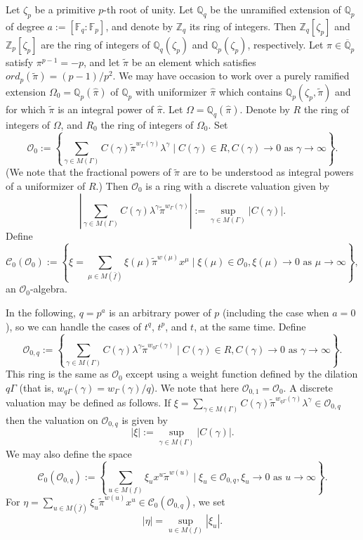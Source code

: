 \documentclass{article}
\theoremstyle{remark}
\def\bb #1{ {\mathbb #1} }
\def\c #1{ {\mathcal #1} }
\begin{document}
\bigskip{}  Let $\zeta_p$ be a primitive $p$-th root of unity. Let $\bb Q_q$ be the unramified extension of $\bb Q_p$ of degree $a := [\bb F_q : \bb F_p]$, and denote by $\bb Z_q$ its ring of integers. Then $\bb Z_q[\zeta_p]$ and $\bb Z_p[\zeta_p]$ are the ring of integers of $\bb Q_q(\zeta_p)$ and $\bb Q_p(\zeta_p)$, respectively. Let $\pi \in \overline{\bb Q}_p$  satisfy $\pi^{p-1} = -p$, and let $\tilde \pi$ be an element which satisfies $ord_p(\tilde \pi) = (p-1) / p^2$. We may have occasion to work over a purely ramified extension $\Omega_0 = \bb Q_p(\hat \pi)$  of $\bb Q_p$ with uniformizer $\hat \pi$ which contains $\bb Q_p(\zeta_p, \tilde \pi)$ and for which $\tilde \pi$ is an integral power of $\hat \pi.$ Let $\Omega = \bb Q_q(\hat \pi).$ Denote by $R$ the ring of integers  of $\Omega$, and $R_0$ the ring of integers of $\Omega_0$. Set
\[
\c O_0 := \left\{ \sum_{\gamma \in M(\Gamma)} C(\gamma) \tilde \pi^{w_\Gamma(\gamma)} \lambda^\gamma  \mid C(\gamma) \in R, C(\gamma) \rightarrow 0 \text{ as } \gamma \rightarrow \infty \right\}.
\]
(We note that the fractional powers of $\tilde \pi$ are to be understood as integral powers of a uniformizer of $R$.) Then $\c O_0$ is a ring with a discrete valuation given by
\[
\left| \sum_{\gamma \in M(\Gamma)} C(\gamma) \lambda^\gamma \tilde \pi^{w_\Gamma(\gamma)} \right| := \sup_{\gamma \in M(\Gamma)} | C(\gamma) |.
\]
Define
\[
\c C_0(\c O_0) := \left\{\xi = \sum_{\mu \in M(\bar f)} \xi(\mu) \tilde \pi^{w(\mu)} x^\mu \mid \xi(\mu) \in \c O_0, \xi(\mu) \rightarrow 0 \text{ as } \mu \rightarrow \infty \right\},
\]
an $\c O_0$-algebra. 

In the following, $q = p^a$ is an arbitrary power of $p$ (including the case when $a = 0$), so we can handle the cases of $t^q$, $t^p$, and $t$, at the same time. Define
\begin{equation}\label{E: 32}
\c O_{0, q} := \left\{ \sum_{\gamma \in M(\Gamma)} C(\gamma) \lambda^{\gamma} \tilde \pi^{w_{q\Gamma}(\gamma)} \mid C(\gamma) \in R, C(\gamma) \rightarrow 0 \text{ as } \gamma \rightarrow \infty \right\}.
\end{equation}
This ring is the same as $\c O_0$ except using a weight function defined by the dilation $q \Gamma$ (that is, $w_{q \Gamma}(\gamma) = w_\Gamma(\gamma) / q$). We note that here $\c O_{0, 1} = \c O_0$. A discrete valuation may be defined as follows. If $\xi = \sum_{\gamma \in M(\Gamma)} C(\gamma) \tilde \pi^{w_{q\Gamma}(\gamma)} \lambda^\gamma \in \c O_{0,q}$ then the valuation on $\c O_{0,q}$ is given by
\[
| \xi | := \sup_{\gamma \in M(\Gamma)} |C(\gamma)|.
\]
We may also define the space
\begin{equation}\label{E: 33}
\c C_0(\c O_{0,q}) := \left\{ \sum_{u \in M(f)} \xi_u x^u \tilde \pi^{w(u)} \mid \xi_u \in \c O_{0, q},  \xi_u \rightarrow 0 \text{ as } u \rightarrow \infty \right\}.
\end{equation}
For $\eta = \sum_{u \in M(\bar f)} \xi_u \tilde \pi^{w(u)} x^u \in \c C_0 (\c O_{0,q})$, we set
\[
|\eta| = \sup_{u \in M(f)} |\xi_u|.
\]
\end{document}

